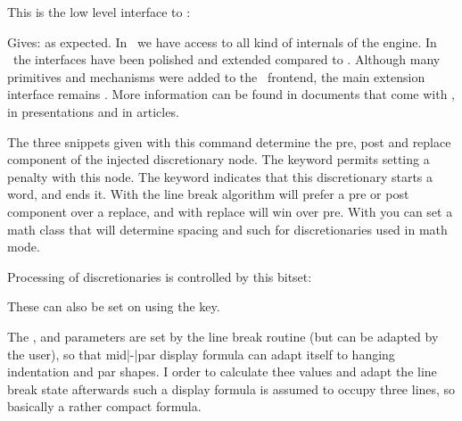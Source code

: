 \stopnewprimitive

\startnewprimitive[title={\prm {directlua}}]

This is the low level interface to \LUA:

\startbuffer
{}
\stopbuffer

Gives: \quotation {\inlinebuffer} as expected. In \LUA\ we have access to all
kind of internals of the engine. In \LUAMETATEX\ the interfaces have been
polished and extended compared to \LUATEX. Although many primitives and
mechanisms were added to the \TEX\ frontend, the main extension interface remains
\LUA. More information can be found in documents that come with \CONTEXT, in
presentations and in articles.

\stopnewprimitive

\startoldprimitive[title={\prm {discretionary}}]

The three snippets given with this command determine the pre, post and replace
component of the injected discretionary node. The  keyword permits
setting a penalty with this node. The  keyword indicates that
this discretionary starts a word, and  ends it. With 
the line break algorithm will prefer a pre or post component over a replace, and
with  replace will win over pre. With  you can set a
math class that will determine spacing and such for discretionaries used in math
mode.

\stopoldprimitive

\startnewprimitive[title={\prm {discretionaryoptions}}]

Processing of discretionaries is controlled by this bitset:


These can also be set on  using the  key.

\stopnewprimitive

\startoldprimitive[title={\prm {displayindent}}]

The ,  and 
parameters are set by the line break routine (but can be adapted by the user), so
that mid|-|par display formula can adapt itself to hanging indentation and par
shapes. I order to calculate thee values and adapt the line break state
afterwards such a display formula is assumed to occupy three lines, so basically
a rather compact formula.

